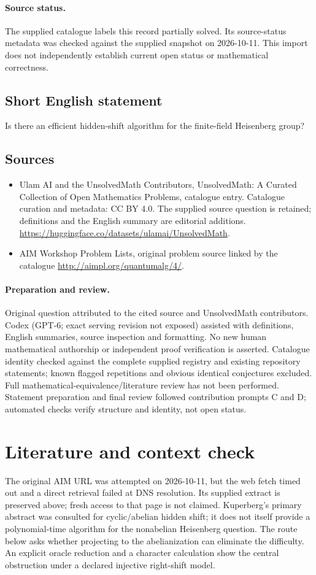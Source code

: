 \documentclass[11pt]{article}
\begin{document}
\paragraph{Source status.}
The supplied catalogue labels this record partially solved. Its source-status metadata was checked against the supplied snapshot on 2026-10-11. This import does not independently establish current open status or mathematical correctness.
\subsection{Short English statement}
Is there an efficient hidden-shift algorithm for the finite-field Heisenberg group?
\subsection{Sources}
\begin{itemize}
\item[S1] Ulam AI and the UnsolvedMath Contributors, UnsolvedMath: A Curated Collection of Open Mathematics Problems, catalogue entry. Catalogue curation and metadata: CC BY 4.0. The supplied source question is retained; definitions and the English summary are editorial additions.
\url{https://huggingface.co/datasets/ulamai/UnsolvedMath}.
\item[S2] AIM Workshop Problem Lists, original problem source linked by the catalogue
\url{http://aimpl.org/quantumalg/4/}.
\end{itemize}
\paragraph{Preparation and review.}
Original question attributed to the cited source and UnsolvedMath contributors. Codex (GPT-6; exact serving revision not exposed) assisted with definitions, English summaries, source inspection and formatting. No new human mathematical authorship or independent proof verification is asserted. Catalogue identity checked against the complete supplied registry and existing repository statements; known flagged repetitions and obvious identical conjectures excluded. Full mathematical-equivalence/literature review has not been performed. Statement preparation and final review followed contribution prompts C and D; automated checks verify structure and identity, not open status.
\label{end:statement}

\section{Literature and context check}
The original AIM URL was attempted on 2026-10-11, but the web fetch timed out and a direct retrieval failed at DNS resolution. Its supplied extract is preserved above; fresh access to that page is not claimed. Kuperberg's primary abstract was consulted for cyclic/abelian hidden shift; it does not itself provide a polynomial-time algorithm for the nonabelian Heisenberg question. The route below asks whether projecting to the abelianization can eliminate the difficulty. An explicit oracle reduction and a character calculation show the central obstruction under a declared injective right-shift model.
\end{document}
